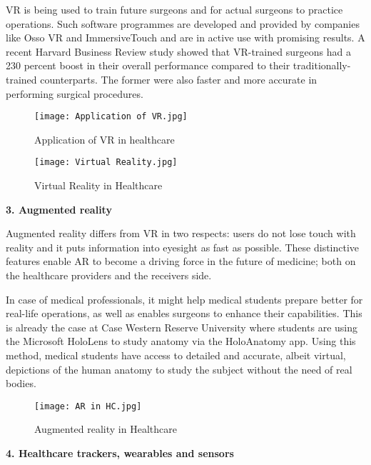 \documentclass[12pt,a4paper]{article}
\begin{document}
VR is being used to train future surgeons and for actual surgeons to practice operations. Such software programmes are developed and provided by companies like Osso VR and ImmersiveTouch and are in active use with promising results. A recent Harvard Business Review study showed that VR-trained surgeons had a 230 percent boost in their overall performance compared to their traditionally-trained counterparts. The former were also faster and more accurate in performing surgical procedures.


\begin{figure}[h]
\centering
\texttt{[image: Application of VR.jpg]}
\caption{Application of VR in healthcare}
\end{figure}

\begin{figure}[h]
\centering
\texttt{[image: Virtual Reality.jpg]}
\caption{Virtual Reality in Healthcare}
\end{figure}


\clearpage



\textbf{3. Augmented reality}

\hspace{1cm}

Augmented reality differs from VR in two respects: users do not lose touch with reality and it puts information into eyesight as fast as possible. These distinctive features enable AR to become a driving force in the future of medicine; both on the healthcare providers and the receivers side.

In case of medical professionals, it might help medical students prepare better for real-life operations, as well as enables surgeons to enhance their capabilities. This is already the case at Case Western Reserve University where students are using the Microsoft HoloLens to study anatomy via the HoloAnatomy app. Using this method, medical students have access to detailed and accurate, albeit virtual, depictions of the human anatomy to study the subject without the need of real bodies.


\begin{figure}[h]
\centering
\texttt{[image: AR in HC.jpg]}
\caption{Augmented reality in Healthcare}
\end{figure}








\textbf{4. Healthcare trackers, wearables and sensors}
\end{document}
